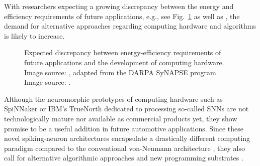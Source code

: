 With researchers expecting a growing discrepancy between the energy and efficiency requirements of future applications, e.g., see Fig.~\ref{fig:energy_efficiency_issues} as well as \textcite{Marr2013, Farahini2016, Akopyan2015}, the demand for alternative approaches regarding computing hardware and algorithms is likely to increase.
\begin{figure}[h!]
    \centering
    \caption{Expected discrepancy between energy-efficiency requirements of future applications and the development of computing hardware.~\protect{} Image source: \textcite{Farahini2016}, adapted from the \acs{DARPA} \acs{SyNAPSE} program.~\protect{} Image source: \textcite{Marr2013}.}
    \label{fig:energy_efficiency_issues}
\end{figure}
Although the neuromorphic prototypes of computing hardware such as \ac{SpiNNaker} \parencite{Furber2014} or  IBM's TrueNorth \parencite{Akopyan2015} dedicated to processing so-called \acp{SNN} are not technologically mature nor available as commercial products yet, they show promise to be a useful addition in future automotive applications.
Since these novel spiking-neuron architectures encapsulate a drastically different computing paradigm compared to the conventional von-Neumann architecture \parencite{vonNeumann1993}, they also call for alternative algorithmic approaches and new programming substrates \parencite{Amir2013}.

